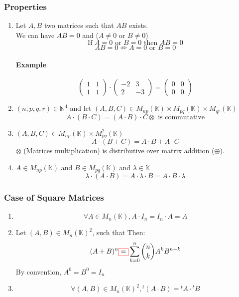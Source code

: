 \documentclass[notitlepage]{math}
\begin{document}
\subsubsection{Properties}
\begin{enumerate}
    \item Let $A,B$ two matrices such that $AB$ exists. \\
    We can have $AB = 0$ and ($A \neq 0$ or $B \neq 0$)\\
    \[ \text{If } A = 0 \text{ or } B = 0 \text{ then } AB = 0 \]
    \[ AB = 0 \nRightarrow A = 0 \text{ or } B = 0 \]
    \paragraph{Example}
    \[\begin{pmatrix}
        1 & 1 \\
        1 & 1 
    \end{pmatrix} \cdot \begin{pmatrix}
        -2 & 3 \\
        2 & -3 
    \end{pmatrix} = \begin{pmatrix}
        0 & 0 \\
        0 & 0
    \end{pmatrix}\]
    \item $(n,p,q,r) \in \mathbb{N}^4$ and let $ (A,B,C) \in M_{np}(\mathbb{K}) \times M_{pq}(\mathbb{K}) \times M_{qr}(\mathbb{K})$\\
    \[ A \cdot (B \cdot C) = (A \cdot B) \cdot C \otimes \text{ is commutative}\] 
    \item $(A,B,C) \in M_{np}(\mathbb{K}) \times M_{pq}^2(\mathbb{K})$
    \[ A \cdot (B + C) = A \cdot B + A \cdot C\]
    $\otimes$ (Matrices multiplication) is distributive over matrix addition ($\oplus$). 
    \item $ A \in M_{np}(\mathbb{K})$ and $B \in M_{pq}(\mathbb{K})$ and $ \lambda \in \mathbb{K}$\\
    \[ \lambda \cdot (A \cdot B) = A \cdot \lambda \cdot B = A \cdot B \cdot \lambda \] 
\end{enumerate}
\subsubsection{Case of Square Matrices}
\begin{enumerate}
    \item \[ \forall A \in M_{n}(\mathbb{K}), A \cdot I_n  = I_n \cdot A = A \]
    \item Let $(A,B) \in M_{n}(\mathbb{K})^2$, such that {} Then:
    \[ (A+B)^n { \color{red}{\fbox{\color{black}$ = $}}} \sum_{k=0}^{n} \binom{n}{k} A^k B^{n-k} \]
    By convention, $A^0 = B^0 = I_n$\\
    \item \[ \forall (A,B) \in M_{n}(\mathbb{K})^2, {} ^ t (A \cdot B) = {} ^t A \cdot {} ^ t B \]
\end{enumerate}
\end{document}
